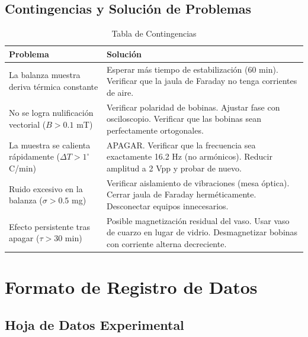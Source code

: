 \documentclass[12pt, a4paper]{article}
\begin{document}
\subsection{Contingencias y Solución de Problemas}

\begin{table}[h!]
\centering
\caption{Tabla de Contingencias}
\begin{tabular}{@{}p{5cm}p{6cm}@{}}
\toprule
\textbf{Problema} & \textbf{Solución} \\ \midrule
La balanza muestra deriva térmica constante & Esperar más tiempo de estabilización (60 min). Verificar que la jaula de Faraday no tenga corrientes de aire. \\ \addlinespace
No se logra nulificación vectorial ($B > 0.1$ mT) & Verificar polaridad de bobinas. Ajustar fase con osciloscopio. Verificar que las bobinas sean perfectamente ortogonales. \\ \addlinespace
La muestra se calienta rápidamente ($\Delta T > 1^\circ$C/min) & APAGAR. Verificar que la frecuencia sea exactamente 16.2 Hz (no armónicos). Reducir amplitud a 2 Vpp y probar de nuevo. \\ \addlinespace
Ruido excesivo en la balanza ($\sigma > 0.5$ mg) & Verificar aislamiento de vibraciones (mesa óptica). Cerrar jaula de Faraday herméticamente. Desconectar equipos innecesarios. \\ \addlinespace
Efecto persistente tras apagar ($\tau > 30$ min) & Posible magnetización residual del vaso. Usar vaso de cuarzo en lugar de vidrio. Desmagnetizar bobinas con corriente alterna decreciente. \\ \bottomrule
\end{tabular}
\end{table}

\section{Formato de Registro de Datos}

\subsection{Hoja de Datos Experimental}
\end{document}
